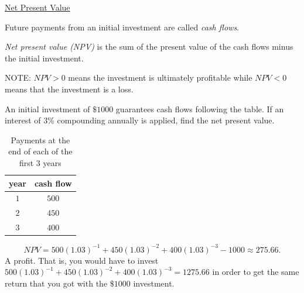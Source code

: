 \underline{Net Present Value}

\begin{definition}
    Future payments from an initial investment are called \emph{cash flows}.
\end{definition}

\begin{definition}
    \emph{Net present value (NPV)} is the sum of the present value of the cash flows minus the initial investment.
\end{definition}

NOTE: \(NPV>0\) means the investment is ultimately profitable while \(NPV<0\) means that the investment is a loss.

\begin{example}
    An initial investment of \(\$1000\) guarantees cash flows following the table. If an interest of \(3\%\) compounding annually is applied, find the net present value.
    \begin{table}[]
        \centering
        \begin{tabular}{c|c}
            year & cash flow \\\hline
             \(1\)&\(500\) \\
             \(2\)& \(450\) \\
             \(3\)& \(400\)
        \end{tabular}
        \caption{Payments at the end of each of the first \(3\) years}
    \end{table}

    \begin{solution}
        \[NPV = 500(1.03)^{-1}+450(1.03)^{-2}+400(1.03)^{-3}  - 1000 \approx 275.66.\]
        A profit. That is, you would have to invest \(500(1.03)^{-1}+450(1.03)^{-2}+400(1.03)^{-3} = 1275.66\) in order to get the same return that you got with the \(\$1000\) investment.
    \end{solution}
\end{example}